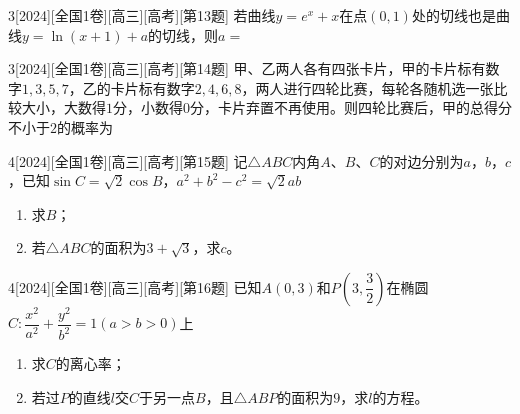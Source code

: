\begin{example}{3}[2024][全国1卷][高三][高考][第13题]
若曲线$y=e^x+x$在点$(0,1)$处的切线也是曲线$y=\ln(x+1)+a$的切线，则$a=$\blankline
\end{example}

\begin{example}{3}[2024][全国1卷][高三][高考][第14题]
甲、乙两人各有四张卡片，甲的卡片标有数字$1,3,5,7$，乙的卡片标有数字$2,4,6,8$，两人进行四轮比赛，每轮各随机选一张比较大小，大数得$1$分，小数得$0$分，卡片弃置不再使用。则四轮比赛后，甲的总得分不小于$2$的概率为\blankline
\end{example}
\begin{example}{4}[2024][全国1卷][高三][高考][第15题]
记$\triangle ABC$内角$A$、$B$、$C$的对边分别为$a$，$b$，$c$，已知$\sin C=\sqrt{2}\cos B$，$a^2+b^2-c^2=\sqrt{2}ab$
\begin{enumerate}
\item 求$B$；
\item 若$\triangle ABC$的面积为$3+\sqrt{3}$，求$c$。
\end{enumerate}
\end{example}

\begin{example}{4}[2024][全国1卷][高三][高考][第16题]
已知$A(0,3)$和$P\left(3,\dfrac{3}{2}\right)$在椭圆$C:\dfrac{x^2}{a^2}+\dfrac{y^2}{b^2}=1(a>b>0)$上
\begin{enumerate}
\item 求$C$的离心率；
\item 若过$P$的直线$l$交$C$于另一点$B$，且$\triangle ABP$的面积为$9$，求$l$的方程。
\end{enumerate}
\end{example}

